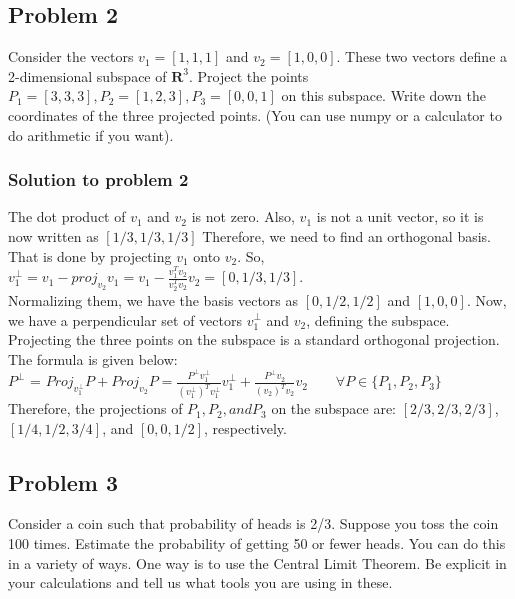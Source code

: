 \documentclass[12pt]{article}%
\begin{document}

\subsection{Problem 2}

Consider the vectors $v_1 = [1, 1, 1]$ and $v_2 = [1, 0, 0]$. These two vectors define a 2-dimensional subspace of $\mathbf{R}^3$. Project the points $P_1 = [3, 3, 3], P_2 = [1, 2, 3], P_3 = [0, 0, 1]$ on this subspace. Write down the coordinates of the three projected points. (You can use numpy or a calculator to do arithmetic if you want).

\subsubsection{Solution to problem 2}
The dot product of $v_1$ and $v_2$ is not zero. Also, $v_1$ is not a unit vector, so it is now written as $[1/3, 1/3, 1/3]$ Therefore, we need to find an orthogonal basis. That is done by projecting $v_1$ onto $v_2$. So, $v_1^\perp = v_1 - proj_{v_2}v_1 = v_1 - \frac{v_1^T v_2}{v_2^T v_2}v_2 = [0, 1/3, 1/3]$.\\ 

Normalizing them, we have the basis vectors as $[0, 1/2, 1/2]$ and $[1, 0, 0]$. Now, we have a perpendicular set of vectors $v_1^\perp$ and $v_2$, defining the subspace. Projecting the three points on the subspace is a standard orthogonal projection. The formula is given below:\\
$P^\perp$ = $Proj_{v_1^\perp} P + Proj_{v_2} P = \frac{P^\perp v_1^\perp}{(v_1^\perp)^T v_1^\perp} v_1^\perp + \frac{P^\perp v_2}{(v_2)^T v_2} v_2 \qquad \forall P \in \{P_1, P_2, P_3\}$\\

Therefore, the projections of $P_1, P_2, and P_3$ on the subspace are: $[2/3, 2/3, 2/3]$, $[1/4, 1/2, 3/4]$, and $[0, 0, 1/2]$, respectively.


\subsection{Problem 3}

Consider a coin such that probability of heads is 2/3. Suppose you toss the coin 100 times. Estimate the probability of getting 50 or fewer heads. You can do this in a variety of ways. One way is to use the Central Limit Theorem. Be explicit in your calculations and tell us what tools you are using in these.
\end{document}
